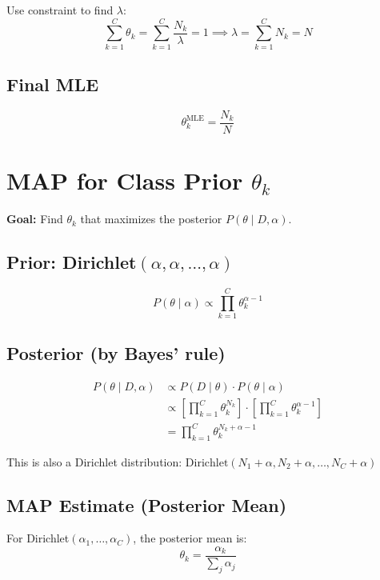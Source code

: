 \documentclass[11pt]{article}
\begin{document}
Use constraint to find $\lambda$:
\begin{equation}
\sum_{k=1}^C \theta_k = \sum_{k=1}^C \frac{N_k}{\lambda} = 1 \implies \lambda = \sum_{k=1}^C N_k = N
\end{equation}

\subsection{Final MLE}
\begin{equation}
\boxed{\theta_k^{\text{MLE}} = \frac{N_k}{N}}
\end{equation}

\section{MAP for Class Prior $\theta_k$}

\textbf{Goal:} Find $\theta_k$ that maximizes the posterior $P(\theta \mid D, \alpha)$.

\subsection{Prior: Dirichlet$(\alpha, \alpha, \ldots, \alpha)$}
\begin{equation}
P(\theta \mid \alpha) \propto \prod_{k=1}^C \theta_k^{\alpha-1}
\end{equation}

\subsection{Posterior (by Bayes' rule)}
\begin{align}
P(\theta \mid D, \alpha) &\propto P(D \mid \theta) \cdot P(\theta \mid \alpha) \\
&\propto \left[\prod_{k=1}^C \theta_k^{N_k}\right] \cdot \left[\prod_{k=1}^C \theta_k^{\alpha-1}\right] \\
&= \prod_{k=1}^C \theta_k^{N_k + \alpha - 1}
\end{align}

This is also a Dirichlet distribution: $\text{Dirichlet}(N_1 + \alpha, N_2 + \alpha, \ldots, N_C + \alpha)$

\subsection{MAP Estimate (Posterior Mean)}
For Dirichlet$(\alpha_1, \ldots, \alpha_C)$, the posterior mean is:
\begin{equation}
\theta_k = \frac{\alpha_k}{\sum_j \alpha_j}
\end{equation}
\end{document}
